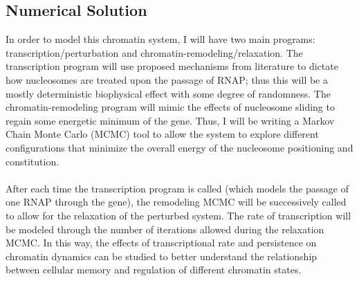 \documentclass[12pt]{article}
\begin{document}
\subsection*{Numerical Solution}
In order to model this chromatin system, I will have two main programs: transcription/perturbation and chromatin-remodeling/relaxation. The transcription program will use proposed mechanisms from literature to dictate how nucleosomes are treated upon the passage of RNAP; thus this will be a mostly deterministic biophysical effect with some degree of randomness. The chromatin-remodeling program will mimic the effects of nucleosome sliding to regain some energetic minimum of the gene. Thus, I will be writing a Markov Chain Monte Carlo (MCMC) tool to allow the system to explore different configurations that minimize the overall energy of the nucleosome positioning and constitution.\\
\\
After each time the transcription program is called (which models the passage of one RNAP through the gene), the remodeling MCMC will be successively called to allow for the relaxation of the perturbed system. The rate of transcription will be modeled through the number of iterations allowed during the relaxation MCMC. In this way, the effects of transcriptional rate and persistence on chromatin dynamics can be studied to better understand the relationship between cellular memory and regulation of different chromatin states.
 
 
\end{document}
